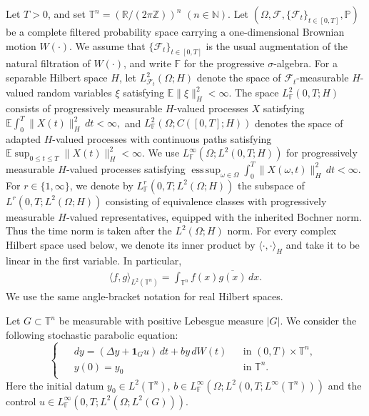 \documentclass[print,wide]{draft}
\begin{document}

Let \(T>0\), and set  
\(\mathbb{T}^n=(\mathbb{R}/(2\pi\mathbb{Z}))^n\) \((n\in\mathbb{N})\).  
Let \((\Omega,\mathcal{F},\{\mathcal{F}_t\}_{t\in[0,T]},\mathbb{P})\) be a complete filtered probability space carrying a one-dimensional Brownian motion \(W(\cdot)\).  
We assume that \(\{\mathcal{F}_t\}_{t\in[0,T]}\) is the usual augmentation of the natural filtration of \(W(\cdot)\), and write \(\mathbb{F}\) for the progressive \(\sigma\)-algebra.  
For a separable Hilbert space \(H\), let \(L^2_{\mathcal{F}_t}(\Omega;H)\) denote the space of \(\mathcal{F}_t\)-measurable \(H\)-valued random variables \(\xi\) satisfying \(\mathbb{E}\|\xi\|_H^2<\infty\).  
The space \(L^2_{\mathbb{F}}(0,T;H)\) consists of progressively measurable \(H\)-valued processes \(X\) satisfying  
$
\mathbb{E}\int_0^T\|X(t)\|_H^2\,dt<\infty,
$
and \(L^2_{\mathbb{F}}(\Omega;C([0,T];H))\) denotes the space of adapted \(H\)-valued processes with continuous paths satisfying  
$
\mathbb{E}\sup_{0\leq t\leq T}\|X(t)\|_H^2<\infty.
$
We use \(L^\infty_{\mathbb{F}}(\Omega;L^2(0,T;H))\) for progressively measurable \(H\)-valued processes satisfying  
$
\operatorname*{ess\,sup}_{\omega\in\Omega}\int_0^T\|X(\omega,t)\|_H^2\,dt<\infty.
$
For \(r\in\{1,\infty\}\), we denote by \(L^r_{\mathbb{F}}(0,T;L^2(\Omega;H))\) the subspace of \(L^r(0,T;L^2(\Omega;H))\) consisting of equivalence classes with progressively measurable \(H\)-valued representatives, equipped with the inherited Bochner norm. Thus the time norm is taken after the \(L^2(\Omega;H)\) norm.  
For every complex Hilbert space used below, we denote its inner
product by $\langle\cdot,\cdot\rangle_H$ and take it to be linear
in the first variable. In particular,
\begin{align*}
\langle f,g\rangle_{L^2(\mathbb T^n)}
=\int_{\mathbb T^n}f(x)\overline{g(x)}\,dx.
\end{align*}
We use the same angle-bracket notation for real Hilbert spaces.

Let $G\subset\mathbb{T}^n$ be measurable with positive Lebesgue measure $|G|$.  We consider the following stochastic parabolic equation:
%
\begin{equation}\label{eq:forward}
\begin{cases}
\begin{aligned}
&d y=(\Delta y+\mathbf{1}_Gu)\,d t+b y\,d W(t)
&&\text{in }(0,T)\times\mathbb{T}^n,\\
&y(0)=y_0
&&\text{in }\mathbb{T}^n.
\end{aligned}
\end{cases}
\end{equation}
Here the initial datum $y_0\in L^2(\mathbb{T}^n)$, $b\in L^\infty_{\mathbb F}(\Omega;L^2(0,T;L^\infty(\mathbb{T}^n)))$ and the control
$u\in L^\infty_{\mathbb F}(0,T;L^2(\Omega;L^2(G)))$.
\end{document}
